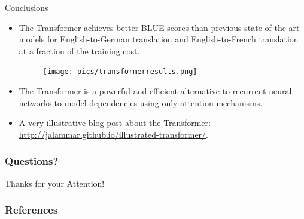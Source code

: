 \documentclass[handout]{beamer}
\begin{document}
\begin{frame}{Conclusions}
\begin{scriptsize}
\begin{itemize}

 \item The Transformer achieves better BLUE scores than previous state-of-the-art models for English-to-German translation and English-to-French translation at a fraction of the training cost.

      \begin{figure}[h]
        	\texttt{[image: pics/transformerresults.png]}
        \end{figure}  

\item The Transformer is a powerful and efficient alternative to recurrent neural networks to model dependencies using only attention mechanisms.

\item A very illustrative blog post about the Transformer: \url{http://jalammar.github.io/illustrated-transformer/}.
 
\end{itemize}

\end{scriptsize}


\end{frame}

\begin{frame}
\frametitle{Questions?}
\begin{center}\LARGE Thanks for your Attention!\\ \end{center}



\end{frame}

\begin{frame}[allowframebreaks]\scriptsize
\frametitle{References}


%
\end{frame}  


\end{document}
